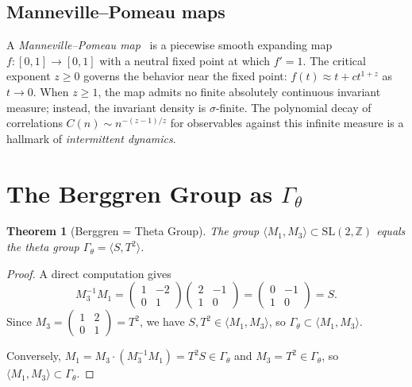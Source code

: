 \documentclass[12pt]{amsart}
\newtheorem{theorem}{Theorem}[section]
\theoremstyle{definition}
\theoremstyle{remark}
\newcommand{\SL}{\mathrm{SL}}
\newcommand{\Z}{\mathbb{Z}}
\newcommand{\Gtheta}{\Gamma_\theta}
\begin{document}
\subsection{Manneville--Pomeau maps}

A \emph{Manneville--Pomeau map}~\cite{manneville-pomeau} is a piecewise
smooth expanding map $f\colon [0,1] \to [0,1]$ with a neutral fixed
point at which $f'=1$.  The critical exponent $z \ge 0$ governs the
behavior near the fixed point: $f(t) \approx t + ct^{1+z}$ as $t\to 0$.
When $z \ge 1$, the map admits no finite absolutely continuous invariant
measure; instead, the invariant density is $\sigma$-finite.  The
polynomial decay of correlations $C(n) \sim n^{-(z-1)/z}$ for observables
against this infinite measure is a hallmark of \emph{intermittent
dynamics}.


\section{The Berggren Group as $\Gtheta$}\label{sec:berggren-theta}

\begin{theorem}[Berggren = Theta Group]\label{thm:theta}
The group $\langle M_1, M_3\rangle \subset \SL(2,\Z)$ equals the theta
group $\Gtheta = \langle S, T^2\rangle$.
\end{theorem}

\begin{proof}
A direct computation gives
\[
M_3^{-1} M_1
= \begin{pmatrix}1&-2\\0&1\end{pmatrix}
  \begin{pmatrix}2&-1\\1&0\end{pmatrix}
= \begin{pmatrix}0&-1\\1&0\end{pmatrix}
= S.
\]
Since $M_3 = \left(\begin{smallmatrix}1&2\\0&1\end{smallmatrix}\right)
= T^2$, we have $S, T^2 \in \langle M_1, M_3\rangle$, so
$\Gtheta \subset \langle M_1, M_3\rangle$.

Conversely, $M_1 = M_3 \cdot (M_3^{-1} M_1) = T^2 S \in \Gtheta$ and
$M_3 = T^2 \in \Gtheta$, so $\langle M_1, M_3\rangle \subset \Gtheta$.
\end{proof}
\end{document}
